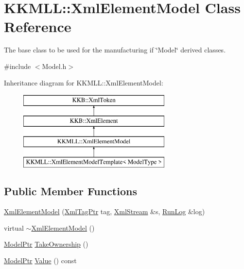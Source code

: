 \hypertarget{class_k_k_m_l_l_1_1_xml_element_model}{}\section{K\+K\+M\+LL\+:\+:Xml\+Element\+Model Class Reference}
\label{class_k_k_m_l_l_1_1_xml_element_model}


The base class to be used for the manufacturing if \char`\"{}\+Model\char`\"{} derived classes.  




{\ttfamily \#include $<$Model.\+h$>$}

Inheritance diagram for K\+K\+M\+LL\+:\+:Xml\+Element\+Model\+:\begin{figure}[H]
\begin{center}
\leavevmode
\includegraphics[height=4.000000cm]{class_k_k_m_l_l_1_1_xml_element_model}
\end{center}
\end{figure}
\subsection*{Public Member Functions}
\begin{DoxyCompactItemize}
\item 
\hyperlink{class_k_k_m_l_l_1_1_xml_element_model_af5c9146a507167b183ab8d614b6445fa}{Xml\+Element\+Model} (\hyperlink{namespace_k_k_b_a9253a3ea8a5da18ca82be4ca2b390ef0}{Xml\+Tag\+Ptr} tag, \hyperlink{class_k_k_b_1_1_xml_stream}{Xml\+Stream} \&s, \hyperlink{class_k_k_b_1_1_run_log}{Run\+Log} \&log)
\item 
virtual \hyperlink{class_k_k_m_l_l_1_1_xml_element_model_aa0610b4f76079d74f40b2772f73f21e4}{$\sim$\+Xml\+Element\+Model} ()
\item 
\hyperlink{namespace_k_k_m_l_l_a5e593621576d583bef55408bd6a3cfd5}{Model\+Ptr} \hyperlink{class_k_k_m_l_l_1_1_xml_element_model_afdfc907a83f08b5df048d54b634d09c5}{Take\+Ownership} ()
\item 
\hyperlink{namespace_k_k_m_l_l_a5e593621576d583bef55408bd6a3cfd5}{Model\+Ptr} \hyperlink{class_k_k_m_l_l_1_1_xml_element_model_ad3f8c2cfc3a165b2fc22e29f71b56af2}{Value} () const 
\end{DoxyCompactItemize}
